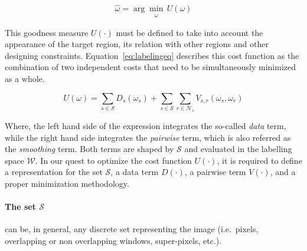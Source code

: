 \begin{equation}
\hat{\omega} = \arg \min_{\substack{\omega}} \,U(\omega)
\label{eq:costMin}
\end{equation}


This goodness measure $U(\cdot)$ must be defined to take into account the appearance of the target region, its relation with other regions and other designing constraints.
Equation~\eqref{eq:labelingeq} describes this cost function as the combination of two independent costs that need to be simultaneously minimized as a whole.

\begin{equation}
  U(\omega) = \sum_{s\in \mathcal{S}} D_s(\omega_s) + \sum_{s \in \mathcal{S}}\sum_{r \in \mathcal{N}_{s}} V_{s,r}(\omega_s,\omega_r)
  \label{eq:labelingeq}
\end{equation}

Where, the left hand side of the expression integrates the so-called \emph{data} term, while the right hand side integrates the \emph{pairwise} term, which is also referred as the \emph{smoothing} term.
Both terms are shaped by $\mathcal{S}$ and evaluated in the labelling space $\mathcal{W}$.
%
In our quest to optimize the cost function $U(\cdot)$, it is required to define a representation for the set $\mathcal{S}$, a data term $D(\cdot)$, a pairwise term $V(\cdot)$, and a proper minimization methodology.

\paragraph{The set $\mathcal{S}$}
can be, in general, any discrete set representing the image (i.e.\, pixels, overlapping or non overlapping windows, super-pixels, etc.). 

